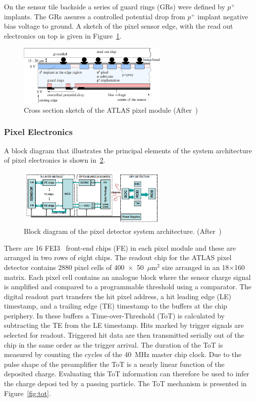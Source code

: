 On the sensor tile backside a series of guard rings (GRs) were defined by $p^+$ implants. The GRs 
assures a controlled potential drop from  $p^+$ implant negative bias voltage to ground. 
A sketch of the pixel sensor edge, with the read out electronics on top is given in 
Figure~\ref{fig:sensorbb}.
\begin{figure}[!htbp]
\centering
\includegraphics[width=0.65\textwidth]{sensorbb.png}
\caption{\label{fig:sensorbb} Cross section sketch of the ATLAS pixel module (After~\cite{Altenheiner:2012zz})}
\end{figure}

\subsubsection{Pixel Electronics}
\label{sec:pixelsensors}
A block diagram that illustrates the principal elements of the system architecture of pixel 
electronics is shown in~\ref{fig:pixelel}.

\begin{figure}[!htbp]
\centering
\includegraphics[width=0.65\textwidth]{pixelel.png}
\caption{\label{fig:pixelel}Block diagram of the pixel detector system architecture. (After~\cite{AtlasPixels})}
\end{figure}
There are 16 FEI3~\cite{FEI3} front-end chips (FE) in each pixel module and these are arranged in two rows of eight chips. 
The readout chip for the ATLAS pixel detector contains 2880 pixel cells of 400~$\times$~50~$\mu$m$^2$ size arranged in an 18$\times$160 matrix. Each pixel cell contains 
an analogue block where the sensor charge signal is amplified and compared to a programmable
threshold using a comparator. The digital readout part transfers the hit pixel address,
a hit leading edge (LE) timestamp, and a trailing edge (TE) timestamp to the buffers at the chip
periphery. In these buffers a Time-over-Threshold (ToT) is calculated by subtracting the TE from
the LE timestamp. Hits marked by trigger signals are
selected for readout. Triggered hit data are then transmitted serially out of the chip in the same
order as the trigger arrival.
 The duration of the ToT is measured by counting the cycles of the 40~MHz master chip
clock. Due to the pulse shape of
the preamplifier the ToT is a nearly linear function of the deposited charge. 
Evaluating this ToT
information can therefore be used to infer the charge deposi
ted by a passing particle.  The ToT  mechanism is presented in Figure~\ref{fig:tot}.

